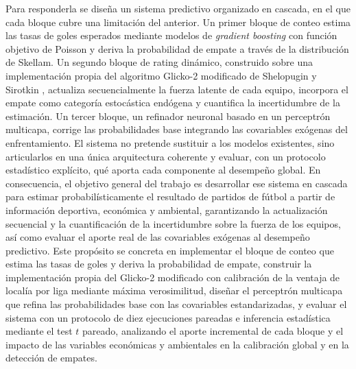 Para responderla se dise\~na un sistema predictivo organizado en cascada, en el que cada bloque cubre una limitaci\'on del anterior. Un primer bloque de conteo estima las tasas de goles esperados mediante modelos de \emph{gradient boosting} con funci\'on objetivo de Poisson y deriva la probabilidad de empate a trav\'es de la distribuci\'on de Skellam. Un segundo bloque de rating din\'amico, construido sobre una implementaci\'on propia del algoritmo Glicko-2 modificado de Shelopugin y Sirotkin \cite{Glicko2Mod}, actualiza secuencialmente la fuerza latente de cada equipo, incorpora el empate como categor\'ia estoc\'astica end\'ogena y cuantifica la incertidumbre de la estimaci\'on. Un tercer bloque, un refinador neuronal basado en un perceptr\'on multicapa, corrige las probabilidades base integrando las covariables ex\'ogenas del enfrentamiento. El sistema no pretende sustituir a los modelos existentes, sino articularlos en una \'unica arquitectura coherente y evaluar, con un protocolo estad\'istico expl\'icito, qu\'e aporta cada componente al desempe\~no global. En consecuencia, el objetivo general del trabajo es desarrollar ese sistema en cascada para estimar probabil\'isticamente el resultado de partidos de f\'utbol a partir de informaci\'on deportiva, econ\'omica y ambiental, garantizando la actualizaci\'on secuencial y la cuantificaci\'on de la incertidumbre sobre la fuerza de los equipos, as\'i como evaluar el aporte real de las covariables ex\'ogenas al desempe\~no predictivo. Este prop\'osito se concreta en implementar el bloque de conteo que estima las tasas de goles y deriva la probabilidad de empate, construir la implementaci\'on propia del Glicko-2 modificado con calibraci\'on de la ventaja de local\'ia por liga mediante m\'axima verosimilitud, dise\~nar el perceptr\'on multicapa que refina las probabilidades base con las covariables estandarizadas, y evaluar el sistema con un protocolo de diez ejecuciones pareadas e inferencia estad\'istica mediante el test $t$ pareado, analizando el aporte incremental de cada bloque y el impacto de las variables econ\'omicas y ambientales en la calibraci\'on global y en la detecci\'on de empates.

